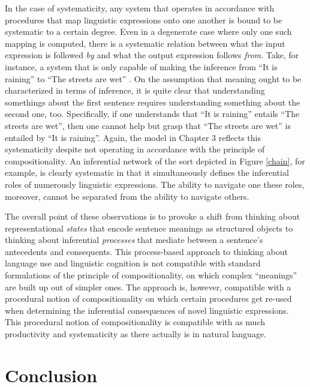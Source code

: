 In the case of systematicity, any system that operates in accordance with procedures that map linguistic expressions onto one another is bound to be systematic to a certain degree. Even in a degenerate case where only one such mapping is computed, there is a systematic relation between what the input expression is followed \textit{by} and what the output expression follows \textit{from}. Take, for instance, a system that is only capable of making the inference from ``It is raining'' to ``The streets are wet'' \citep[][p. 313]{Sellars:1954}. On the assumption that meaning ought to be characterized in terms of inference, it is quite clear that understanding somethings about the first sentence requires understanding something about the second one, too. Specifically, if one understands that ``It is raining'' entails ``The streets are wet'', then one cannot help but grasp that ``The streets are wet'' is entailed by ``It is raining''. Again, the model in Chapter 3 reflects this systematicity despite not operating in accordance with the principle of compositionality. An inferential network of the sort depicted in Figure \ref{chain}, for example, is clearly systematic in that it simultaneously defines the inferential roles of numerously linguistic expressions. The ability to navigate one these roles, moreover, cannot be separated from the ability to navigate others. 

The overall point of these observations is to provoke a shift from thinking about representational \textit{states} that encode sentence meanings as structured objects to thinking about inferential \textit{processes} that mediate between a sentence's antecedents and consequents. This process-based approach to thinking about language use and linguistic cognition is not compatible with standard formulations of the principle of compositionality, on which complex ``meanings'' are built up out of simpler ones. The approach is, however, compatible with a procedural notion of compositionality on which certain procedures get re-used when determining the inferential consequences of novel linguistic expressions. This procedural notion of compositionality is compatible with as much productivity and systematicity as there actually is in natural language. 

\section{Conclusion}

